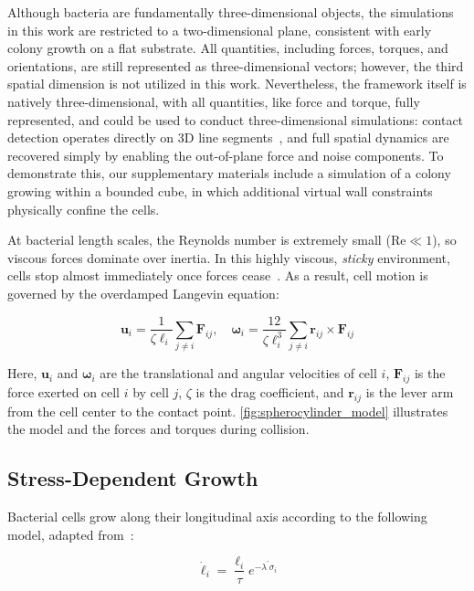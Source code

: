 \documentclass[a4paper,fleqn]{cas-dc}
\begin{document}
Although bacteria are fundamentally three-dimensional objects, the simulations in this work are restricted to a two-dimensional plane, consistent with early colony growth on a flat substrate. All quantities, including forces, torques, and orientations, are still represented as three-dimensional vectors; however, the third spatial dimension is not utilized in this work. Nevertheless, the framework itself is natively three-dimensional, with all quantities, like force and torque, fully represented, and could be used to conduct three-dimensional simulations: contact detection operates directly on 3D line segments~\cite{GeometricTools, Yan2019}, and full spatial dynamics are recovered simply by enabling the out-of-plane force and noise components. To demonstrate this, our supplementary materials include a simulation of a colony growing within a bounded cube, in which additional virtual wall constraints physically confine the cells. 

At bacterial length scales, the Reynolds number is extremely small ($\text{Re} \ll 1$), so viscous forces dominate over inertia. In this highly viscous, \textit{sticky} environment, cells stop almost immediately once forces cease~\cite{datta2024lifelowreynoldsnumber,Rudge2012}. As a result, cell motion is governed by the overdamped Langevin equation:

\begin{equation} \label{eq:overdamped_langevin}
    \mathbf{u}_i = \frac{1}{\zeta \ell_i} \sum_{j \neq i} \mathbf{F}_{ij}, \quad
    \boldsymbol{\omega}_i = \frac{12}{\zeta \ell_i^3} \sum_{j \neq i} \mathbf{r}_{ij} \times \mathbf{F}_{ij}
\end{equation}

Here, $\mathbf{u}_i$ and $\boldsymbol{\omega}_i$ are the translational and angular velocities of cell $i$, $\mathbf{F}_{ij}$ is the force exerted on cell $i$ by cell $j$, $\zeta$ is the drag coefficient, and $\mathbf{r}_{ij}$ is the lever arm from the cell center to the contact point. \autoref{fig:spherocylinder_model} illustrates the model and the forces and torques during collision.

\subsection{Stress-Dependent Growth}

Bacterial cells grow along their longitudinal axis according to the following model, adapted from~\cite{Weady2024SM}:

\begin{equation} \label{eq:growth}
    \dot{\ell}_i = \frac{\ell_i}{\tau} e^{-\lambda^{'} \sigma_i}
\end{equation}
\end{document}
